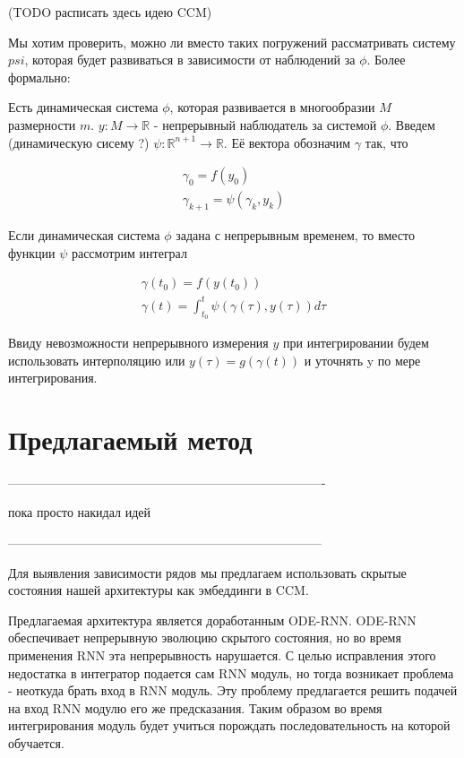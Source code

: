 \documentclass[12pt, twoside]{article}
\begin{document}
(TODO   расписать здесь идею CCM) 

Мы хотим проверить, можно ли вместо таких погружений рассматривать систему $psi$, которая будет развиваться в зависимости от наблюдений за $\phi$. Более формально:

Есть динамическая система $\phi$, которая развивается в многообразии $M$ размерности $m$. $y: M \rightarrow \mathbb R$ - непрерывный наблюдатель за системой $\phi$.
Введем (динамическую сисему ?) $\psi: \mathbb R^{n + 1} \rightarrow \mathbb {R}$. Её вектора обозначим $\gamma$ так, что 

\begin{equation}
	\begin{split}
		\gamma_0 = f(y_0) \\ 
		\gamma_{k + 1} = \psi(\gamma_k, y_k)
    \end{split}
\end{equation}

Если динамическая система $\phi$ задана с непрерывным временем, то вместо функции $\psi$ рассмотрим интеграл

\begin{equation}
	\begin{split}
		\gamma(t_0) = f(y(t_0)) \\
		\gamma(t) = \int_{t_0}^{t} \psi(\gamma(\tau), y(\tau)) d\tau
    \end{split}
\end{equation}

Ввиду невозможности непрерывного измерения $y$ при интегрировании будем использовать интерполяцию или $ y(\tau) = g(\gamma(t))$ и уточнять y по мере интегрирования.



\section{Предлагаемый метод}
----------------------------------------------------------------------------

пока просто накидал идей

---------------------------------------------------------------------------

Для выявления зависимости рядов мы предлагаем использовать скрытые состояния нашей архитектуры как эмбеддинги в CCM. 

Предлагаемая архитектура является доработанным ODE-RNN. ODE-RNN обеспечивает непрерывную эволюцию скрытого состояния, но во время применения RNN эта непрерывность нарушается.
С целью исправления этого недостатка в интегратор подается сам RNN модуль, но тогда возникает проблема - неоткуда брать вход в RNN модуль. Эту проблему предлагается решить подачей на вход 
RNN модулю его же предсказания. Таким образом во время интегрирования модуль будет учиться порождать последовательность на которой обучается.
\end{document}
